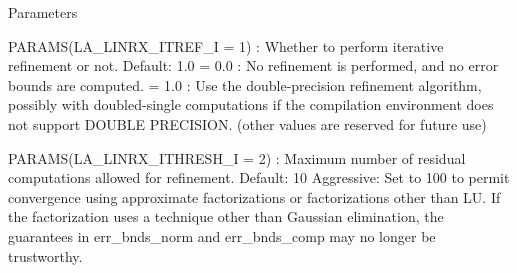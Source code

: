 \begin{DoxyParams}[1]{Parameters}
\begin{DoxyVerb}
       PARAMS(LA_LINRX_ITREF_I = 1) : Whether to perform iterative
            refinement or not.
         Default: 1.0
            = 0.0 : No refinement is performed, and no error bounds are
                    computed.
            = 1.0 : Use the double-precision refinement algorithm,
                    possibly with doubled-single computations if the
                    compilation environment does not support DOUBLE
                    PRECISION.
              (other values are reserved for future use)

       PARAMS(LA_LINRX_ITHRESH_I = 2) : Maximum number of residual
            computations allowed for refinement.
         Default: 10
         Aggressive: Set to 100 to permit convergence using approximate
                     factorizations or factorizations other than LU. If
                     the factorization uses a technique other than
                     Gaussian elimination, the guarantees in
                     err_bnds_norm and err_bnds_comp may no longer be
                     trustworthy.


\end{DoxyVerb}
\end{DoxyParams}
